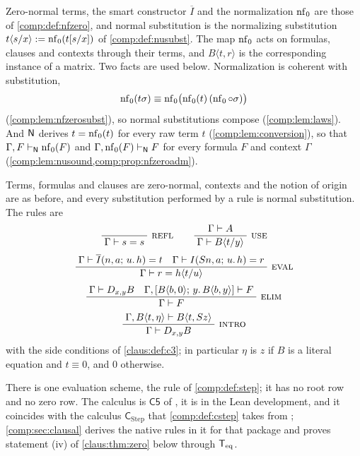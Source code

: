 Zero-normal terms, the smart constructor $\overline{I}$ and the
normalization $\operatorname{nf}_0$ are those of \cref{comp:def:nfzero}, and normal
substitution is the normalizing substitution
$t\langle s/x\rangle\mathrel{:=}\operatorname{nf}_0(t[s/x])$ of \cref{comp:def:nusubst}.
The map $\operatorname{nf}_0$ acts on formulas, clauses and contexts through their terms,
and $B\langle t,r\rangle$ is the corresponding instance of a matrix. Two
facts are used below. Normalization is coherent with substitution,
\[
 \operatorname{nf}_0(t\sigma)\equiv\operatorname{nf}_0\bigl(\operatorname{nf}_0(t)\,(\operatorname{nf}_0\circ\sigma)\bigr)
\]
(\cref{comp:lem:nfzerosubst}), so normal substitutions compose
(\cref{comp:lem:laws}). And $\mathsf{N}$ derives $t=\operatorname{nf}_0(t)$ for every raw term
$t$ (\cref{comp:lem:conversion}), so that $\Gamma,F\vdash_{\mathsf{N}}\operatorname{nf}_0(F)$
and $\Gamma,\operatorname{nf}_0(F)\vdash_{\mathsf{N}}F$ for every formula $F$ and context
$\Gamma$ (\cref{comp:lem:nusound,comp:prop:nfzeroadm}).


\begin{definition}
\label{claus:def:c0}
Terms, formulas and clauses are zero-normal, contexts and the notion of
origin are as before, and every substitution performed by a rule is normal
substitution. The rules are
\[
 \infrule{}{\Gamma\proves s=s}\ \rulename{Refl}
 \qquad
 \infrule{\Gamma\proves A}{\Gamma\proves B\langle t/y\rangle}\ \rulename{Use}
\]
\[
 \infrule{\Gamma\proves\overline{I}(n,a;\,u.\,h)=t\quad
          \Gamma\proves\It{\Suc n}{a}{u}{h}=r}
         {\Gamma\proves r=h\langle t/u\rangle}\ \rulename{Eval}
\]
\[
 \infrule{\Gamma\proves\D{x}{y}B\quad
          \Gamma,[B\langle b,0\rangle;\,y.\,B\langle b,y\rangle]\proves F}
         {\Gamma\proves F}\ \rulename{Elim}
\]
\[
 \infrule{\Gamma,B\langle t,\eta\rangle\proves B\langle t,\Suc z\rangle}
         {\Gamma\proves\D{x}{y}B}\ \rulename{Intro}
\]
with the side conditions of \cref{claus:def:c3}; in particular $\eta$ is
$z$ if $B$ is a literal equation and $t\equiv 0$, and $0$ otherwise.
\end{definition}

There is one evaluation scheme, the rule  of
\cref{comp:def:step}; it has no root row and no zero row. The calculus is
$\mathsf{C5}$ of , it is  in
the Lean development, and it coincides with the calculus
$\mathsf{C}_{\mathrm{Step}}$ that \cref{comp:def:cstep} takes from
; \cref{comp:sec:clausal} derives the native rules in it
for that package and proves statement (iv) of \cref{claus:thm:zero} below
through $\mathsf{T}_{\mathrm{eq}}$.

